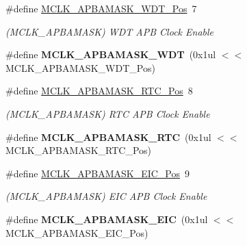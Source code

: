 \begin{DoxyCompactItemize}
\item 
\hypertarget{group___s_a_m_l21___m_c_l_k_ga65b51937fbcdf1a5d7418bbfd0cb3a4e}{}\#define \hyperlink{group___s_a_m_l21___m_c_l_k_ga65b51937fbcdf1a5d7418bbfd0cb3a4e}{M\+C\+L\+K\+\_\+\+A\+P\+B\+A\+M\+A\+S\+K\+\_\+\+W\+D\+T\+\_\+\+Pos}~7\label{group___s_a_m_l21___m_c_l_k_ga65b51937fbcdf1a5d7418bbfd0cb3a4e}

\begin{DoxyCompactList}\small\item\em (M\+C\+L\+K\+\_\+\+A\+P\+B\+A\+M\+A\+S\+K) W\+D\+T A\+P\+B Clock Enable \end{DoxyCompactList}\item 
\hypertarget{group___s_a_m_l21___m_c_l_k_ga7840b89731ff3eb4be62d16784fa2bc2}{}\#define {\bfseries M\+C\+L\+K\+\_\+\+A\+P\+B\+A\+M\+A\+S\+K\+\_\+\+W\+D\+T}~(0x1ul $<$$<$ M\+C\+L\+K\+\_\+\+A\+P\+B\+A\+M\+A\+S\+K\+\_\+\+W\+D\+T\+\_\+\+Pos)\label{group___s_a_m_l21___m_c_l_k_ga7840b89731ff3eb4be62d16784fa2bc2}

\item 
\hypertarget{group___s_a_m_l21___m_c_l_k_ga29bcfd311e7858237139c52fa164728d}{}\#define \hyperlink{group___s_a_m_l21___m_c_l_k_ga29bcfd311e7858237139c52fa164728d}{M\+C\+L\+K\+\_\+\+A\+P\+B\+A\+M\+A\+S\+K\+\_\+\+R\+T\+C\+\_\+\+Pos}~8\label{group___s_a_m_l21___m_c_l_k_ga29bcfd311e7858237139c52fa164728d}

\begin{DoxyCompactList}\small\item\em (M\+C\+L\+K\+\_\+\+A\+P\+B\+A\+M\+A\+S\+K) R\+T\+C A\+P\+B Clock Enable \end{DoxyCompactList}\item 
\hypertarget{group___s_a_m_l21___m_c_l_k_gafe14ec8c85deabba0ae8f43d80415b39}{}\#define {\bfseries M\+C\+L\+K\+\_\+\+A\+P\+B\+A\+M\+A\+S\+K\+\_\+\+R\+T\+C}~(0x1ul $<$$<$ M\+C\+L\+K\+\_\+\+A\+P\+B\+A\+M\+A\+S\+K\+\_\+\+R\+T\+C\+\_\+\+Pos)\label{group___s_a_m_l21___m_c_l_k_gafe14ec8c85deabba0ae8f43d80415b39}

\item 
\hypertarget{group___s_a_m_l21___m_c_l_k_ga5071841327f5691fad5aaa64928723b4}{}\#define \hyperlink{group___s_a_m_l21___m_c_l_k_ga5071841327f5691fad5aaa64928723b4}{M\+C\+L\+K\+\_\+\+A\+P\+B\+A\+M\+A\+S\+K\+\_\+\+E\+I\+C\+\_\+\+Pos}~9\label{group___s_a_m_l21___m_c_l_k_ga5071841327f5691fad5aaa64928723b4}

\begin{DoxyCompactList}\small\item\em (M\+C\+L\+K\+\_\+\+A\+P\+B\+A\+M\+A\+S\+K) E\+I\+C A\+P\+B Clock Enable \end{DoxyCompactList}\item 
\hypertarget{group___s_a_m_l21___m_c_l_k_ga6d055e2f0b11b2e2892aa84f9d2d28a3}{}\#define {\bfseries M\+C\+L\+K\+\_\+\+A\+P\+B\+A\+M\+A\+S\+K\+\_\+\+E\+I\+C}~(0x1ul $<$$<$ M\+C\+L\+K\+\_\+\+A\+P\+B\+A\+M\+A\+S\+K\+\_\+\+E\+I\+C\+\_\+\+Pos)\label{group___s_a_m_l21___m_c_l_k_ga6d055e2f0b11b2e2892aa84f9d2d28a3}


\end{DoxyCompactItemize}
